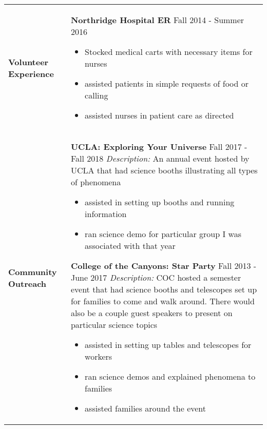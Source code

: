 \documentclass[10pt]{article}
\newcommand*\leftright[2]{%
  \leavevmode
  \rlap{#1}%
  \hspace{0.5\linewidth}%
  #2}
\begin{document}
\begin{longtable}{l l l l}
    \multicolumn{1}{p{2cm}}{\textbf{Volunteer \newline Experience}}     &
        \multicolumn{3}{p{16cm}}{
        \textbf{Northridge Hospital ER} \newline
        \leftright{\textit{ER Volunteer}}{Fall 2014 - Summer 2016}
        \begin{itemize}[noitemsep,nolistsep]
            \item Stocked medical carts with necessary items for nurses
            \item assisted patients in simple requests of food or calling
            \item assisted nurses in patient care as directed
        \end{itemize}
        \baselineskip} \\ 
    \multicolumn{1}{p{2cm}}{\textbf{Community \newline Outreach}}       &
        \multicolumn{3}{p{16cm}}{
        \textbf{UCLA: Exploring Your Universe} \newline
        \leftright{\textit{Booth Volunteer}}{Fall 2017 - Fall 2018} \newline
        \textit{Description:} An annual event hosted by UCLA that had science booths illustrating all types of phenomena
        \begin{itemize}[noitemsep,nolistsep]
            \item assisted in setting up booths and running information
            \item ran science demo for particular group I was associated with that year
        \end{itemize}
        
        \textbf{College of the Canyons: Star Party} \newline
        \leftright{\textit{Booth Volunteer}}{Fall 2013 - June 2017} \newline
        \textit{Description:} COC hosted a semester event that had science booths and telescopes set up for families to come and walk around. There would also be a couple guest speakers to present on particular science topics
        \begin{itemize}[noitemsep,nolistsep]
            \item assisted in setting up tables and telescopes for workers
            \item ran science demos and explained phenomena to families
            \item assisted families around the event
        \end{itemize}
        
}
\end{longtable}
\end{document}

